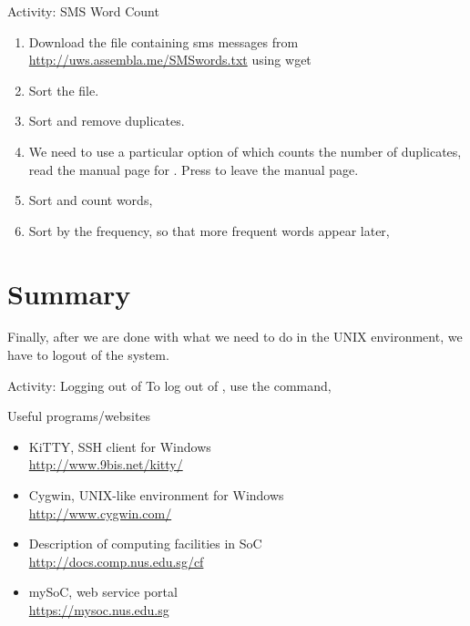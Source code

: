 \begin{frame}[allowframebreaks=0.6]{Activity: SMS Word Count}

\begin{enumerate}
\item Download the file containing sms messages from \url{http://uws.assembla.me/SMSwords.txt} using wget 
\item Sort the file.   
\item Sort and remove duplicates.    
\item We need to use a particular option of  which counts the
number of duplicates, read the manual page for . Press 
to leave the manual page.  
\item Sort and count words,  
\item Sort by the frequency, so that more frequent words appear later, 
\end{enumerate}
\end{frame}

\section{Summary} %


Finally, after we are done with what we need to do in the UNIX environment, we
have to logout of the system.  

\begin{frame}{Activity: Logging out of }
To log out of , use the  command, 
\end{frame}

\begin{frame}{Useful programs/websites}
\begin{itemize}
\item KiTTY, SSH client for Windows\\ \url{http://www.9bis.net/kitty/}
\item Cygwin, UNIX-like environment for Windows\\ \url{http://www.cygwin.com/}
\item Description of computing facilities in SoC\\ \url{http://docs.comp.nus.edu.sg/cf}
\item mySoC, web service portal\\ \url{https://mysoc.nus.edu.sg}
\end{itemize}
\end{frame}
















